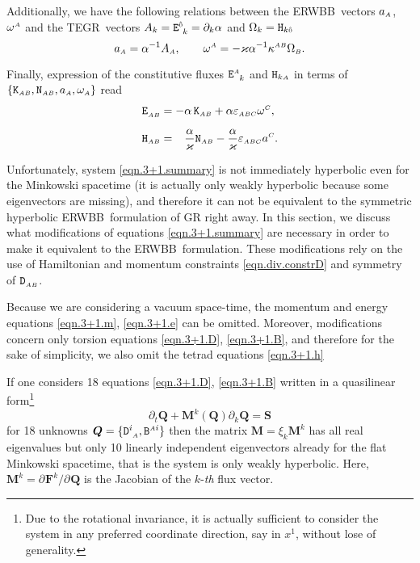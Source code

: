\documentclass[
10pt, %
a4paper, %
oneside, %
twocolumn,
headinclude,footinclude, %
BCOR5mm, %
]{scrartcl}
\newcommand{\ERWBB}{{ERWBB}}
\newcommand{\sA}{\mathsmaller A}
\newcommand{\sB}{\mathsmaller B}
\newcommand{\sC}{\mathsmaller C}
\newcommand{\pd}[1]{\partial_{#1}}
\newcommand{\MG}[1]{\kappa^{#1}}			%
\newcommand{\Dfin}[2]{\mathtt{D}_{\phantom{#2}#1}^{#2}}	%
\newcommand{\Hfin}[2]{\mathtt{H}_{#2#1}}	%
\newcommand{\Efin}[2]{\mathtt{E}^{#1}_{\phantom{#1}#2}}	%
\newcommand{\Kbuch}[2]{\mathtt{K}_{{#1}{#2}}}	%
\newcommand{\Nbuchdown}[2]{\mathtt{N}_{#1#2}}	%
\newcommand{\Bfin}[2]{\mathtt{B}^{#1#2}}	%
\newcommand{\LCtens}{\varepsilon} %
\newcommand{\tegr}{TEGR}
\newcommand{\indalg}[1]{\hat{\mathsmaller{#1}}}
\newcommand{\lapse}{\alpha}
\begin{document}
	Additionally, we have the following relations between the \ERWBB\ vectors $
	a_{\sA} $, $ \omega^{\sA} $ and the \tegr\ vectors $
	A_{k}=\Efin{\indalg{0}}{k} = \pd{k}\lapse $ and $ \Omega_{k} =
	\Hfin{\indalg{0}}{k} $
	\begin{equation}\label{eqn.Buchman.TEGR.AW}
		a_{\sA} = \lapse^{-1} A_{\sA},
		\qquad
		\omega^{\sA} =-\varkappa \lapse^{-1} \MG{\sA\sB} \Omega_{\sB}.
	\end{equation}
	
	Finally, expression of the 
	constitutive fluxes $ \Efin{\sA}{k} $ and $ \Hfin{\sA}{k} $ in terms of $ 
	\{\Kbuch{\sA}{\sB},\Nbuchdown{\sA}{\sB},a_{\sA},\omega_{\sA}\} $ read
	\begin{subequations}\label{eqn.const.KN}
		\begin{align}
			\Efin{}{\sA\sB} &=
			- \lapse \,\Kbuch{\sA}{\sB} 
			+ \lapse \LCtens_{\sA\sB\sC} \omega^\sC ,
			\\[2mm]
			\Hfin{\sB}{\sA} &= 
			\phantom{-}\frac{\lapse}{\varkappa} \Nbuchdown{\sA}{\sB} 
			- \frac{\lapse}{\varkappa} 
			\LCtens_{\sA\sB\sC} a^\sC .
		\end{align}
	\end{subequations}
	
	Unfortunately, system \eqref{eqn.3+1.summary} is not immediately hyperbolic even for the 
	Minkowski 
	spacetime (it is actually only weakly hyperbolic because some eigenvectors are missing), and 
	therefore it can not be equivalent to the symmetric hyperbolic \ERWBB\ formulation 
	of GR right away. In this section, we discuss what modifications of equations 
	\eqref{eqn.3+1.summary} are 
	necessary in order to make it equivalent to the \ERWBB\ formulation.
	These modifications rely on the use of Hamiltonian and momentum constraints 
	\eqref{eqn.div.constrD} and symmetry of $ \Dfin{\sA\sB}{} $. 
	
	Because we are considering a vacuum space-time, the momentum and energy equations 
	\eqref{eqn.3+1.m}, 
	\eqref{eqn.3+1.e} can be omitted. Moreover, modifications concern only torsion equations 
	\eqref{eqn.3+1.D}, \eqref{eqn.3+1.B}, and 
	therefore for the sake of simplicity, we also omit the tetrad equations \eqref{eqn.3+1.h}
	
	If one considers 18 equations \eqref{eqn.3+1.D}, \eqref{eqn.3+1.B} written in a 
	quasilinear form\footnote{Due to the rotational invariance, 
		it is actually sufficient to consider the system in any preferred coordinate direction, say 
		in $ x^1 
		$, without lose of generality.}
	\begin{equation}\label{eqn.quasi.lin}
		\pd{t} \bm{Q} + \bm{M}^k(\bm{Q})\pd{k} \bm{Q} = \bm{S}
	\end{equation}
	for 18 unknowns $ \bm{Q}=\{ \Dfin{\sA}{i}, \Bfin{\sA}{i} \} $ then the matrix $ \bm{M} = \xi_k 
	\bm{M}^k $ has all real eigenvalues but only 10 linearly independent eigenvectors already for 
	the 
	flat Minkowski spacetime, that is the 
	system is only 
	weakly hyperbolic. Here, $ \bm{M}^k =
	\pd{}\bm{F}^k/\pd{}\bm{Q} $ is the Jacobian of the $ k $-\textit{th} flux vector.
	
\end{document}
